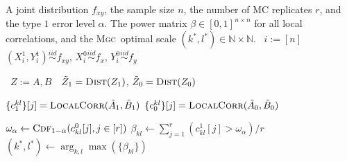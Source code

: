 \documentclass[11pt]{article}
\providecommand{\sct}[1]{{\normalfont\textsc{#1}}}
\newcommand{\G}{c}
\newcommand{\Linefor}[2]{%
    \State \algorithmicfor\ {#1}\ \algorithmicdo\ {#2} \algorithmicend\ \algorithmicfor%
}
\newcommand{\Mgc}{\sct{Mgc}}
\newcommand{\rto}{\leftarrow}
\begin{document}
\begin{algorithm}
\caption{For known distribution, compute the multiscale power map, and the test statistic and optimal scales for Oracle \Mgc. By repeatedly simulating samples by the joint distribution $f_{xy}$, sample data of size $n$ under the null and the alternative are generated for $r$ Monte-Carlo replicates. Then all local correlations under the null and the alternative hypotheses are computed by Algorithm~\ref{alg:all_scales}, followed by estimating the testing power at each local correlation. The optimal scales of Oracle \Mgc~can be found by the scales that maximizes the power map. The running time is $O(rn^2 \log n)$. In the simulations we use $r=2$,$000$ MC replicates to estimate the optimal scale, and another $r=10$,$000$ MC replicates to estimate the power. This algorithm can be similarly adapted to training data, for which the alternative statistic can be computed from the training data while the null statistic can be computed by permutation. Note that power computation for Sample \Mgc~or other benchmarks follows from the same algorithm, by plugging in the respective test statistic in the first loop without the optimal scale computation. }
\label{alg:power}
\begin{algorithmic}[1]
\Require A joint distribution $f_{xy}$, the sample size $n$, the number of MC replicates $r$, and the type $1$ error level $\alpha$.
\Ensure The power matrix $\beta \in [0,1]^{n \times n}$ for all local correlations, and the \Mgc~optimal scale $(k^{*},l^{*}) \in \mathbb{N} \times \mathbb{N}$.
\Linefor{$i:=[n]$}{$(X^{1}_{i},Y^{1}_{i}) \stackrel{iid}{\sim} f_{xy}$, $X^{0}_{i} \stackrel{iid}{\sim} f_{x}$, $Y^{0}_{i} \stackrel{iid}{\sim} f_{y}$} 
\Linefor{$Z:=A,B$}{$\tilde{Z}_{1}=\textsc{Dist}(Z_{1})$, $\tilde{Z}_{0}=\textsc{Dist}(Z_{0})$} 
\State $\{\G^{kl}_{1}\}[j]=\textsc{LocalCorr}(\tilde{A}_{1},\tilde{B}_{1})$ 
\State $\{\G^{kl}_{0}\}[j]=\textsc{LocalCorr}(\tilde{A}_{0},\tilde{B}_{0})$ 
\EndFor

\State $\omega_{\alpha} \rto \textsc{Cdf}_{1-\alpha}(\G^{0}_{kl}[j],j \in [r])$ 
\State $\beta_{kl} \rto \sum_{j=1}^{r}(\G^{1}_{kl}[j]>\omega_{\alpha}) / r$ 
\EndFor
\State $(k^{*},l^{*}) \rto \arg_{k,l}\max(\{\beta_{kl}\})$ 
\EndFunction
\end{algorithmic}
\end{algorithm}
\end{document}
